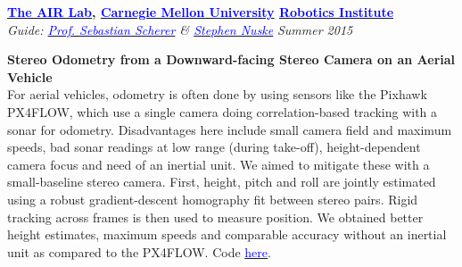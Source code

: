 \documentclass[margin,line]{res}
\newenvironment{list1}{
  \begin{list}{\ding{113}}{%
      \setlength{\itemsep}{0in}
      \setlength{\parsep}{0in} \setlength{\parskip}{0in}
      \setlength{\topsep}{0in} \setlength{\partopsep}{0in} 
      \setlength{\leftmargin}{0.17in}}}{\end{list}}
\begin{document}
\begin{resume}
{\bf  \href{http://theairlab.org/}{\textcolor{blue}{The AIR Lab}}, \href{http://www.cmu.edu/}{\textcolor{blue}{Carnegie Mellon University}} \href{http://ri.cmu.edu/}{\textcolor{blue}{Robotics Institute}}} \\
{\em Guide: \href{http://www.ri.cmu.edu/person.html?person_id=1397}{\textcolor{blue}{Prof. Sebastian Scherer}} \& \href{http://www.ri.cmu.edu/person.html?person_id=2128}{\textcolor{blue} {Stephen Nuske}}} \hfill {\it Summer 2015} \\
\vspace*{-.13in}
\begin{list1}
\item[]\textbf{Stereo Odometry from a Downward-facing Stereo Camera on an Aerial Vehicle} \\
For aerial vehicles, odometry is often done by using sensors like the Pixhawk PX4FLOW, which use a single camera doing correlation-based tracking with a sonar for odometry. Disadvantages here include small camera field and maximum speeds, bad sonar readings at low range (during take-off), height-dependent camera focus and need of an inertial unit. We aimed to mitigate these with a small-baseline stereo camera. First, height, pitch and roll are jointly estimated using a robust gradient-descent homography fit between stereo pairs. Rigid tracking across frames is then used to measure position. We obtained better height estimates, maximum speeds and comparable accuracy without an inertial unit as compared to the PX4FLOW. Code \href{https://github.com/alankarkotwal/ground_odom}{\textcolor{blue} {here}}.
\end{list1}


\end{resume}
\end{document}
